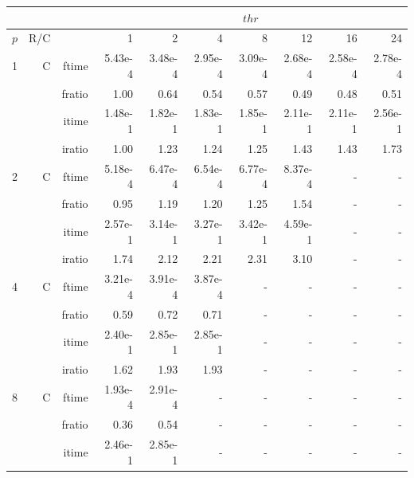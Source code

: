 \documentclass[a4paper]{article}
\begin{document}
\begin{table}[htbp]
\begin{center}
\begin{small}
\begin{tabular}{|r|r|r|r|r|r|r|r|r|r|}
\hline 
     & & & \multicolumn{7}{c|}{$thr$} \\ \hline
    $p$ & R/C &  & 1           & 2    & 4    & 8    & 12   & 16    & 24  \\ \hline\hline
   1 &   C &  ftime &    5.43e-4 &    3.48e-4 &    2.95e-4 &    3.09e-4 &    2.68e-4 &    2.58e-4 &    2.78e-4 \\
             &             &  fratio &    1.00 &    0.64 &    0.54 &    0.57 &    0.49 &    0.48 &    0.51 \\
             &             &  itime &    1.48e-1 &    1.82e-1 &    1.83e-1 &    1.85e-1 &    2.11e-1 &    2.11e-1 &    2.56e-1 \\
             &             &  iratio &    1.00 &    1.23  &    1.24  &    1.25  &    1.43  &    1.43  &    1.73  \\\hline
   2 &  C &  ftime &    5.18e-4 &    6.47e-4 &    6.54e-4 &    6.77e-4 &    8.37e-4 &      - &      - \\
             &             &  fratio &    0.95 &    1.19  &    1.20  &   1.25  &    1.54  &      - &      - \\
             &             &  itime &    2.57e-1 &    3.14e-1 &    3.27e-1 &    3.42e-1 &    4.59e-1 &      - &      - \\
             &             &  iratio &    1.74  &    2.12  &    2.21  &    2.31  &    3.10  &      - &      - \\\hline
   4 &  C &  ftime &    3.21e-4 &    3.91e-4 &    3.87e-4 &      - &      - &      - &      - \\
             &             &  fratio &    0.59 &    0.72 &    0.71 &      - &      - &      - &      - \\
             &             &  itime &    2.40e-1 &    2.85e-1 &    2.85e-1 &      - &      - &      - &      - \\
             &             &  iratio &    1.62  &    1.93  &    1.93  &      - &      - &      - &      - \\\hline
   8 &   C &  ftime &    1.93e-4 &    2.91e-4 &      - &      - &      - &      - &      - \\
             &             &  fratio &    0.36 &    0.54 &      - &      - &      - &      - &      - \\
             &             &  itime &    2.46e-1 &    2.85e-1 &      - &      - &      - &      - &      - \\

\end{tabular}
\end{small}
\end{center}
\end{table}
\end{document}
